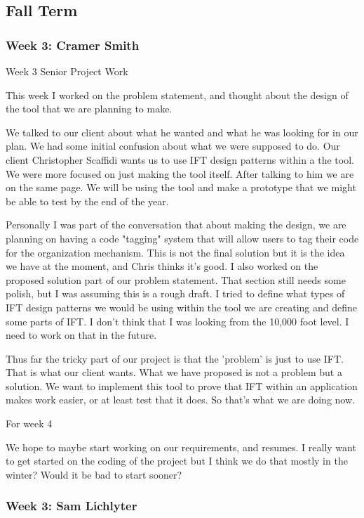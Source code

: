 \subsection{Fall Term}
\subsubsection{Week 3: Cramer Smith}

Week 3 Senior Project Work

This week I worked on the problem statement, and thought about the design of the tool that we are planning to make.

We talked to our client about what he wanted and what he was looking for in our plan. We had some initial confusion about what we were supposed to do. Our client Christopher Scaffidi wants us to use IFT design patterns within a the tool. We were more focused on just making the tool itself. After talking to him we are on the same page. We will be using the tool and make a prototype that we might be able to test by the end of the year. 

Personally I was part of the conversation that about making the design, we are planning on having a code "tagging" system that will allow users to tag their code for the organization mechanism. This is not the final solution but it is the idea we have at the moment, and Chris thinks it's good. I also worked on the proposed solution part of our problem statement. That section still needs some polish, but I was assuming this is a rough draft. I tried to define what types of IFT design patterns we would be using within the tool we are creating and define some parts of IFT. I don't think that I was looking from the 10,000 foot level. I need to work on that in the future.

Thus far the tricky part of our project is that the 'problem' is just to use IFT. That is what our client wants. What we have proposed is not a problem but a solution. We want to implement this tool to prove that IFT within an application makes work easier, or at least test that it does. So that's what we are doing now. 

For week 4

We hope to maybe start working on our requirements, and resumes. I really want to get started on the coding of the project but I think we do that mostly in the winter? Would it be bad to start sooner? 

\subsubsection{Week 3: Sam Lichlyter}

